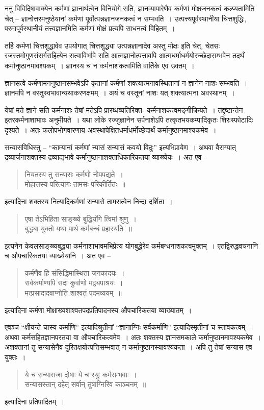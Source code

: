 {ननु विविदिषावाक्येन कर्मणां ज्ञानार्थत्वेन विनियोगे सति, ज्ञानव्यापारेणैव कर्मणां मोक्षजनकत्वं कल्प्यतामिति चेत् – ज्ञानोत्तरमनुष्ठेयानां कर्मणां पूर्वोत्पन्नज्ञानजनकत्वं न सम्भवति~। उत्पत्त्यपूर्वस्थानीया चित्तशुद्धिः, परमापूर्वस्थानीयं तत्त्वज्ञानमिति कर्मणां मोक्षं प्रत्यपि साधनत्वं विहितम्~। 

तर्हि कर्मणां चित्तशुद्धावेव उपयोगात् चित्तशुद्ध्या उत्पन्नज्ञानादेव अस्तु मोक्षः इति चेत्, चेतसः रजस्तमोगुणसंसर्गराहित्येन सत्वाविर्भावे सति आत्मज्ञानोत्पत्तावपि आत्मधर्माधर्मयोरुच्छेदासम्भवेन तदर्थं कर्मानुष्ठानमावश्यकम्~। ज्ञानस्य च न कर्मनाशकत्वमिति वार्तिके एव उक्तम्~। 

ज्ञानसत्वे कर्मणामननुष्ठानसम्भवेऽपि कृतानां कर्मणां शक्त्यात्मनावस्थितानां न ज्ञानेन नाशः सम्भवति~। ज्ञानमपि न वस्तुस्वभावान्यथाकरणक्षमम्~। अयं च वस्तूनां नाशः यत् शक्त्यात्मना अवस्थानम्~। 

येषां मते ज्ञाने सति कर्मनाशः तेषां मतेऽपि प्रारब्धव्यतिरिक्त- कर्मनाशकत्वमङ्गीक्रियते~। तद्दृष्टान्तेन इतरकर्मनाशाभावः अनुमीयते~। यथा लोके रज्जुज्ञानेन सर्पनाशेऽपि तत्कृतभय\-कम्पादिकृतः शिरःस्फोटादिः दृश्यते~। अतः फलोपभोगवारणाय अवस्थापेक्षितधर्माधर्मोच्छेदार्थं कर्मानुष्ठानमाश्यकमेव~। 

सन्यासविधिस्तु – “काम्यानां कर्मणां न्यासं सन्यासं कवयो विदुः” इत्यभिप्रायेण~। अथवा वैराग्यात् द्रव्यार्जनाशक्तस्य द्रव्याद्यभावे कर्मानुष्ठानाशक्ताधिकारिकतया व्याख्येयः~। 	अत एव –
\begin{verse}
नियतस्य तु सन्यासः कर्मणो नोपपद्यते~। \\
मोहात्तस्य परित्यागः तामसः परिकीर्तितः~॥
\end{verse}
इत्यादिना शक्तस्य नित्यादिकर्मणां सन्यासे तामसत्वेन निन्दा दर्शिता~। 		
\begin{verse}
एषा तेऽभिहिता साङ्ख्ये बुद्धिर्योगे त्विमां श्रुणु~। \\
बुद्ध्या युक्तो यथा पार्थ कर्मबन्धं प्रहास्यति~॥
\end{verse}
इत्यनेन केवलसाङ्ख्यबुद्ध्या कर्मनाशाभावमभिप्रेत्य योगबुद्धेरेव कर्मबन्धनाशकत्वमुक्तम्~। एतद्विरुद्धवचनानि च औपचारिकतया व्याख्येयानि~। अत एव –
\begin{verse}
कर्मणैव हि संसिद्धिमास्थिता जनकादयः~। \\
सर्वकर्माण्यपि सदा कुर्वाणो मद्व्यपाश्रयः~। \\
मत्प्रसादादवाप्नोति शाश्वतं पदमव्ययम्~॥
\end{verse}
इत्यादिना कर्मणा मोक्षाख्यशाश्वतपदप्रतिपादनस्य औपचारिकतया व्याख्यातम्~। 

एवञ्च “क्षीयन्ते चास्य कर्माणि” इत्यादिश्रुतीनां “ज्ञानाग्निः सर्वकर्माणि” इत्यादिस्मृतीनां च स्तावकत्वम्~। अथवा कर्मसहितज्ञानपरतया वा औपचारिकत्वमेव~। अतः शक्तस्य ज्ञानसमकाले कर्मानुष्ठानमावश्यकमेव~। अशक्तानां तु सन्यासेनैव दुरितक्षयोत्पत्तिसम्भवात् न कर्मानुष्ठानस्यावश्यकता~। अपि तु तेषां सन्यास एव युक्तः~। 
\begin{verse}
ये च सन्यासजा दोषाः ये च स्युः कर्मसम्भवाः~। \\
सन्यासस्तान् दहेत् सर्वान् तुषाग्निरिव काञ्चनम्~॥
\end{verse}
इत्यादिना प्रतिपादितम्~। 

}
